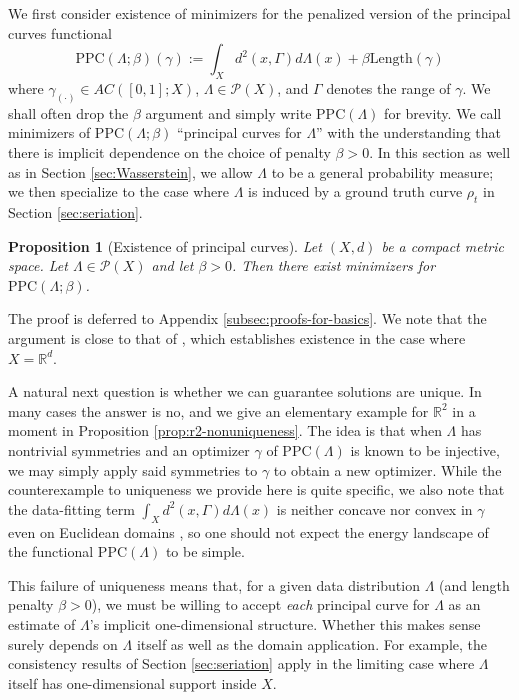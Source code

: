 \documentclass[aos, preprint]{imsart}
\theoremstyle{plain}
\newtheorem{prop}[theorem]{Proposition}
\theoremstyle{remark}
\begin{document}
We first consider existence of  minimizers for the penalized version of the principal curves functional
\[
\mathrm{PPC}(\Lambda;\beta)(\gamma):=\int_X d^2(x,\Gamma)d\Lambda(x) + \beta \mathrm{Length}(\gamma)
\]
where $\gamma_{(\cdot)}\in AC([0,1];X)$, $\Lambda\in\mathcal{P}(X)$,
and $\Gamma$ denotes the range of $\gamma$. We shall often drop the
$\beta$ argument and simply write $\mathrm{PPC}(\Lambda)$ for brevity.
We call minimizers of $\mathrm{PPC}(\Lambda;\beta)$ ``principal curves
for $\Lambda$'' with the understanding that there is implicit dependence on the choice of penalty $\beta>0$. In this section as well as in Section \ref{sec:Wasserstein}, we allow $\Lambda$ to be a general probability measure; we then specialize to the case where $\Lambda$ is induced by a ground truth curve $\rho_t$ in Section \ref{sec:seriation}.

\begin{prop}[Existence of principal curves]
\label{prop:mins-exist}
Let $(X,d)$ be a compact metric space. Let $\Lambda\in\mathcal{P}(X)$ and let $\beta>0$.
Then there exist minimizers for $\mathrm{PPC}(\Lambda;\beta)$.
\end{prop}

The proof is deferred to Appendix \ref{subsec:proofs-for-basics}. We note that the argument is close to that of \cite[Lem. 2.2]{lu2016average}, which establishes existence in the case where $X=\mathbb{R}^d$.

A natural next question is whether we can guarantee solutions are
unique. In many cases the answer is no, and we give an elementary
example for $\mathbb R^2$ in a moment in Proposition
\ref{prop:r2-nonuniqueness}. The idea is that when $\Lambda$ has nontrivial
symmetries and an optimizer $\gamma$ of $\mathrm{PPC}(\Lambda)$ is
known to be injective, we may simply apply said symmetries to $\gamma$
to obtain a new optimizer.
While the counterexample to uniqueness we provide here is quite specific, we also note that the data-fitting term $\int_X d^2(x,\Gamma)d\Lambda(x)$ is neither concave nor convex in $\gamma$ even on Euclidean domains \cite[§ 2.2.1]{kobayashi2024monge}, so one should not expect the energy landscape of the functional $\mathrm{PPC}(\Lambda)$ to be simple.

This failure of uniqueness means that, for a given data distribution $\Lambda$ (and length penalty $\beta>0$), we must be willing to accept \emph{each} principal curve for $\Lambda$ as an estimate of $\Lambda$'s implicit one-dimensional structure. Whether this makes sense surely depends on $\Lambda$ itself as well as the domain application. For example, the consistency results of Section \ref{sec:seriation} apply in the limiting case where $\Lambda$ itself has one-dimensional support inside $X$.
\end{document}

